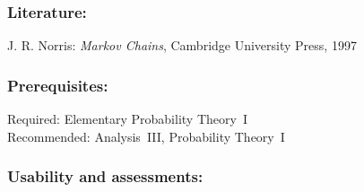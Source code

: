 \documentclass[a4paper,10pt]{article}
\begin{document}
\subsubsection*{\large
    Literature:
}
J. R. Norris: \emph{Markov Chains}, Cambridge University Press, 1997
\subsubsection*{\large
    Prerequisites:
}
Required: Elementary Probability Theory~I \\ 
Recommended: Analysis~III,  Probability Theory~I
\cleardoublepage
\subsubsection*{\large
    Usability and assessments:
}
\end{document}
